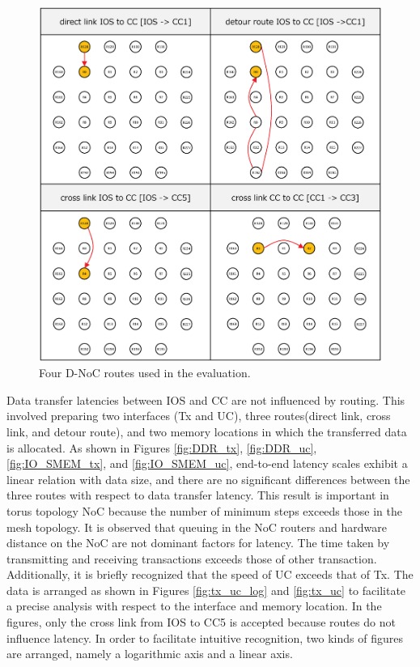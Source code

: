 \documentclass{sig-alternate-05-2015}
\begin{document}
\begin{figure}[t]
  \centering
  \includegraphics[width=1.0\linewidth]{../figure/noc_routes.eps}
  \caption{\label{fig:noc_routes}
    Four D-NoC routes used in the evaluation.}
\end{figure}

Data transfer latencies between IOS and CC are not influenced by routing.
This involved preparing two interfaces (Tx and UC), three routes(direct link, cross link, and detour route), and two memory locations in which the transferred data is allocated.
As shown in Figures \ref{fig:DDR_tx}, \ref{fig:DDR_uc}, \ref{fig:IO_SMEM_tx}, and \ref{fig:IO_SMEM_uc}, 
end-to-end latency scales exhibit a linear relation with data size, and there are no significant differences between the three routes with respect to data transfer latency.
This result is important in torus topology NoC because the number of minimum steps exceeds those in the mesh topology. 
It is observed that queuing in the NoC routers and hardware distance on the NoC are not dominant factors for latency.
The time taken by transmitting and receiving transactions exceeds those of other transaction.
Additionally, it is briefly recognized that the speed of UC exceeds that of Tx.
The data is arranged as shown in Figures \ref{fig:tx_uc_log} and \ref{fig:tx_uc} to facilitate a precise analysis with
respect to the interface and memory location.
In the figures, only the cross link from IOS to CC5 is accepted because routes do not influence latency.
In order to facilitate intuitive recognition, two kinds of figures are arranged, namely a logarithmic axis and a linear axis.
\end{document}
